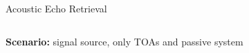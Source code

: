 \begin{frame}{Acoustic Echo Retrieval}
\begin{columns}[T,onlytextwidth]
    \end{columns}

    \pause[6]
    \vfill
    \textcolor{myred}{\textbf{Scenario:} signal source, only TOAs and passive system}

\end{frame}


